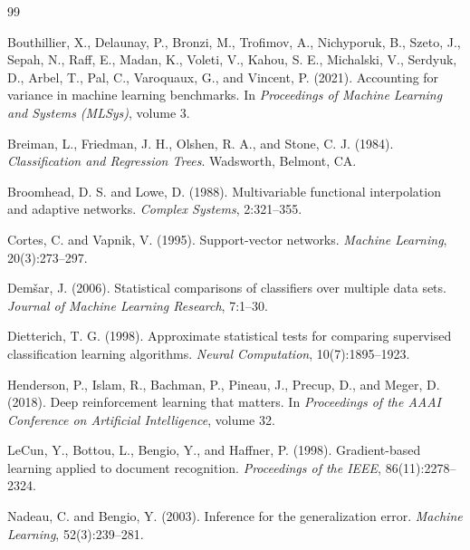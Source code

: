 \documentclass[12pt]{article}
\begin{document}
\begin{thebibliography}{99}

Bouthillier, X., Delaunay, P., Bronzi, M., Trofimov, A., Nichyporuk, B.,
Szeto, J., Sepah, N., Raff, E., Madan, K., Voleti, V., Kahou, S. E.,
Michalski, V., Serdyuk, D., Arbel, T., Pal, C., Varoquaux, G., and
Vincent, P. (2021). Accounting for variance in machine learning benchmarks.
In \emph{Proceedings of Machine Learning and Systems (MLSys)}, volume 3.

Breiman, L., Friedman, J. H., Olshen, R. A., and Stone, C. J. (1984).
\emph{Classification and Regression Trees}. Wadsworth, Belmont, CA.

Broomhead, D. S. and Lowe, D. (1988). Multivariable functional interpolation
and adaptive networks. \emph{Complex Systems}, 2:321--355.

Cortes, C. and Vapnik, V. (1995). Support-vector networks.
\emph{Machine Learning}, 20(3):273--297.

Demšar, J. (2006). Statistical comparisons of classifiers over multiple data
sets. \emph{Journal of Machine Learning Research}, 7:1--30.

Dietterich, T. G. (1998). Approximate statistical tests for comparing
supervised classification learning algorithms.
\emph{Neural Computation}, 10(7):1895--1923.

Henderson, P., Islam, R., Bachman, P., Pineau, J., Precup, D., and
Meger, D. (2018). Deep reinforcement learning that matters. In
\emph{Proceedings of the AAAI Conference on Artificial Intelligence},
volume 32.

LeCun, Y., Bottou, L., Bengio, Y., and Haffner, P. (1998). Gradient-based
learning applied to document recognition.
\emph{Proceedings of the IEEE}, 86(11):2278--2324.

Nadeau, C. and Bengio, Y. (2003). Inference for the generalization error.
\emph{Machine Learning}, 52(3):239--281.


\end{thebibliography}
\end{document}
